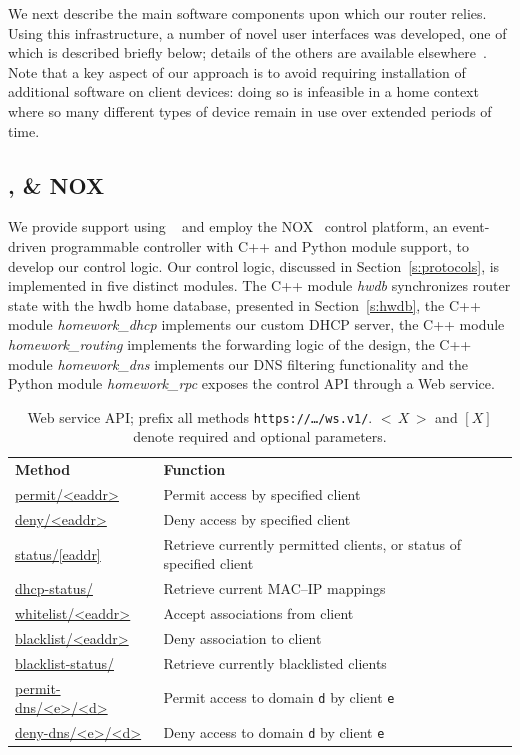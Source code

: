 We next describe the main software components upon which our router relies.
Using this infrastructure, a number of novel user interfaces was developed, one of
which is described briefly below; details of the others are available
elsewhere~.  Note that a key
aspect of our approach is to avoid requiring installation of additional
software on client devices: doing so is infeasible in a home context where so
many different types of device remain in use over extended periods of time.

\subsection{\of, \ovs \& NOX} \label{s:openflow}

We provide \of support using \ovs~ and employ the
NOX~ control platform, an event-driven programmable controller with
C++ and Python module support, to develop our control logic.  Our control logic,
discussed in Section~\ref{s:protocols}, is implemented in five distinct modules.
The C++ module \textit{hwdb} synchronizes router state with the hwdb home
database, presented in Section~\ref{s:hwdb}, the C++ module
\textit{homework\_dhcp} implements our custom DHCP server, the C++ module
\textit{homework\_routing} implements the forwarding logic of the design, the
C++ module \textit{homework\_dns} implements our DNS filtering functionality and
the Python module \textit{homework\_rpc} exposes the control API through a Web
service. 

\begin{table}
  \begin{tabular} {p{}p{}} 
    \textbf{Method} & \textbf{Function} \\ 
    \url{permit/<eaddr>} & Permit access by specified client\\ 
    \url{deny/<eaddr>} & Deny access by specified client\\
    \url{status/[eaddr]} & Retrieve currently permitted clients, or status of specified client \\ 
    \url{dhcp-status/} & Retrieve current MAC--IP mappings\\
    \url{whitelist/<eaddr>} & Accept associations from client\\
    \url{blacklist/<eaddr>} & Deny association to client\\
    \url{blacklist-status/} & Retrieve currently blacklisted clients\\
    \url{permit-dns/<e>/<d>} & Permit access to domain \texttt{d} by client \texttt{e}\\ 
    \url{deny-dns/<e>/<d>} & Deny access to domain \texttt{d} by client \texttt{e}\\ 
  \end{tabular} 
  \caption{\label{t:api}Web service API;
    prefix all methods \texttt{https://\ldots/ws.v1/}.  $<$\,$X$\,$>$ and $[X]$
    denote required and optional parameters.}
\end{table}

